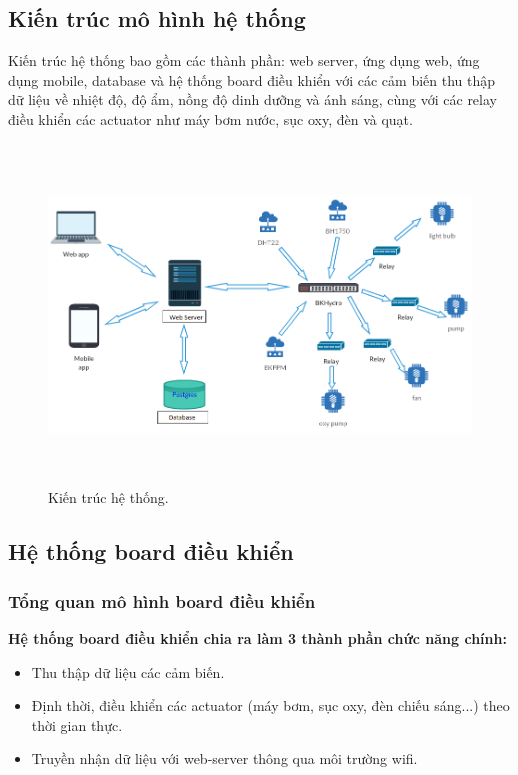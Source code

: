 \documentclass[a4paper,12pt,oneside]{article}
\begin{document}
\subsection{Kiến trúc mô hình hệ thống}
\noindent Kiến trúc hệ thống bao gồm các thành phần: web server, ứng dụng web, ứng dụng mobile, database và hệ thống board điều khiển với các cảm biến thu thập dữ liệu về nhiệt độ, độ ẩm, nồng độ dinh dưỡng và ánh sáng, cùng với các relay điều khiển các actuator như máy bơm nước, sục oxy, đèn và quạt. 

\begin{figure}[H]
	\centering
	\includegraphics[height=9cm,width=13cm]{hinh/system.png}
	\caption{Kiến trúc hệ thống.}
	\label{fig:system}
\end{figure}


\subsection{Hệ thống board điều khiển}

\subsubsection{Tổng quan mô hình board điều khiển}

\noindent \textbf{Hệ thống board điều khiển chia ra làm 3 thành phần chức năng chính:}
\begin{itemize}
\item Thu thập dữ liệu các cảm biến.
\item Định thời, điều khiển các actuator (máy bơm, sục oxy, đèn chiếu sáng...) theo thời gian thực.
\item Truyền nhận dữ liệu với web-server thông qua môi trường wifi.

\end{itemize}
\end{document}
